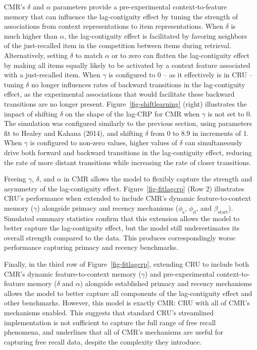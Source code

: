 \documentclass[
  letterpaper,
  DIV=11,
  numbers=noendperiod]{scrartcl}
\begin{document}
CMR's \(\delta\) and \(\alpha\) parameters provide a pre-experimental
context-to-feature memory that can influence the lag-contiguity effect
by tuning the strength of associations from context representations to
item representations. When \(\delta\) is much higher than \(\alpha\),
the lag-contiguity effect is facilitated by favoring neighbors of the
just-recalled item in the competition between items during retrieval.
Alternatively, setting \(\delta\) to match \(\alpha\) or to zero can
flatten the lag-contiguity effect by making all items equally likely to
be activated by a context feature associated with a just-recalled item.
When \(\gamma\) is configured to 0 -- as it effectively is in CRU --
tuning \(\delta\) no longer influences rates of backward transitions in
the lag-contiguity effect, as the experimental associations that would
facilitate these backward transitions are no longer present.
Figure~\ref{fig-shiftlearning} (right) illustrates the impact of
shifting \(\delta\) on the shape of the lag-CRP for CMR when \(\gamma\)
is not set to 0. The simulation was configured similarly to the previous
section, using parameters fit to Healey and Kahana (2014), and shifting
\(\delta\) from 0 to 8.9 in increments of 1. When \(\gamma\) is
configured to non-zero values, higher values of \(\delta\) can
simultaneously drive both forward and backward transitions in the
lag-contiguity effect, reducing the rate of more distant transitions
while increasing the rate of closer transitions.

Freeing \(\gamma\), \(\delta\), and \(\alpha\) in CMR allows the model
to flexibly capture the strength and asymmetry of the lag-contiguity
effect. Figure~\ref{fig-fitlagcrp} (Row 2) illustrates CRU's performance
when extended to include CMR's dynamic feature-to-context memory
(\(\gamma\)) alongside primacy and recency mechanisms
(\(\phi_\text{s}\), \(\phi_\text{d}\), and \(\beta_\text{start}\)).
Simulated summary statistics confirm that this extension allows the
model to better capture the lag-contiguity effect, but the model still
underestimates its overall strength compared to the data. This produces
correspondingly worse performance capturing primacy and recency
benchmarks.

Finally, in the third row of Figure~\ref{fig-fitlagcrp}, extending CRU
to include both CMR's dynamic feature-to-context memory (\(\gamma\)) and
pre-experimental context-to-feature memory (\(\delta\) and \(\alpha\))
alongside established primacy and recency mechanisms allows the model to
better capture all components of the lag-contiguity effect and other
benchmarks. However, this model is exactly CMR: CRU with all of CMR's
mechanisms enabled. This suggests that standard CRU's streamlined
implementation is not sufficient to capture the full range of free
recall phenomena, and underlines that all of CMR's mechanisms are useful
for capturing free recall data, despite the complexity they introduce.
\end{document}
